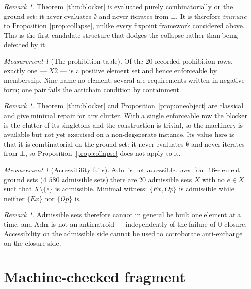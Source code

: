 \documentclass[11pt]{article}
\theoremstyle{definition}
\theoremstyle{plain}
\theoremstyle{remark}
\newtheorem{measurement}[definition]{Measurement}
\newtheorem{remark}[definition]{Remark}
\newcommand{\Adm}{\mathrm{Adm}}
\begin{document}
\begin{remark}
Theorem~\ref{thm:blocker} is evaluated purely combinatorially on the ground set:
it never evaluates $\emptyset$ and never iterates from $\bot$. It is therefore
\emph{immune} to Proposition~\ref{prop:collapse}, unlike every fixpoint framework
considered above. This is the first candidate structure that dodges the collapse
rather than being defeated by it.
\end{remark}

\begin{measurement}[The prohibition table]\label{meas:clutter}
Of the $20$ recorded prohibition rows, exactly one --- $X2$ --- is a positive
element set and hence enforceable by membership. Nine name no element; several
are requirements written in negative form; one pair fails the antichain condition
by containment.
\end{measurement}

\begin{remark}
Theorem~\ref{thm:blocker} and Proposition~\ref{prop:oneobject} are classical and
give minimal repair for any clutter. With a single enforceable row the blocker is
the clutter of its singletons and the construction is trivial, so the machinery is
available but not yet exercised on a non-degenerate instance. Its value here is
that it is combinatorial on the ground set: it never evaluates $\emptyset$ and
never iterates from $\bot$, so Proposition~\ref{prop:collapse} does not apply to
it.
\end{remark}

\begin{measurement}[Accessibility fails]\label{meas:access}
$\Adm$ is not accessible: over four $16$-element ground sets ($4{,}580$ admissible
sets) there are $20$ admissible sets $X$ with no $e \in X$ such that
$X \setminus \{e\}$ is admissible. Minimal witness: $\{Ex, Op\}$ is admissible
while neither $\{Ex\}$ nor $\{Op\}$ is.
\end{measurement}

\begin{remark}
Admissible sets therefore cannot in general be built one element at a time, and
$\Adm$ is not an antimatroid --- independently of the failure of $\cup$-closure.
Accessibility on the admissible side cannot be used to corroborate anti-exchange
on the closure side.
\end{remark}

\section{Machine-checked fragment}\label{sec:lean}
\end{document}
